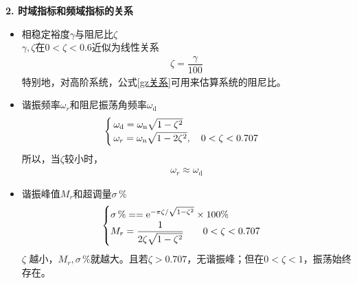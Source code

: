 \noindent \textbf{2. 时域指标和频域指标的关系}
\begin{itemize}
	\item 相稳定裕度$\gamma$与阻尼比$\zeta$\\
	\hspace*{2em} $\gamma,\zeta$在$0<\zeta < 0.6$近似为线性关系
	\begin{align}
		\zeta = \dfrac{\gamma}{100}
		\label{gz关系}
	\end{align} 
	特别地，对高阶系统，公式\eqref{gz关系}可用来估算系统的阻尼比。
	
	\item 谐振频率$\omega_r$和阻尼振荡角频率$\omega_{\text{d}}$
	\[
	\begin{cases}
		\, \omega_{\text{d}} = \omega_{{\rm{n}}} \sqrt{1 - \zeta^2}\\
		\, \omega_r = \omega_{\rm{n}} \sqrt{1 - 2\zeta^2}, \quad 0 < \zeta < 0.707
	\end{cases}
	\]
	 所以，当$\zeta $较小时，
	 \vspace*{-1em}
	 \begin{align}
	 	\omega_r \approx \omega_{\text{d}}
	 \end{align}
 
 	\item 谐振峰值$M_r$和超调量$\sigma\, \%$
 	\begin{align*}
 		\begin{cases}
 			\sigma \, \% =  ={\rm{e}}^{- \pi \zeta / \sqrt{1 - \zeta^2}} \times 100 \%\\
 			M_r = \dfrac{1}{2 \zeta \sqrt{1 - \zeta^2}}\quad \quad 0< \zeta < 0.707
 		\end{cases}
 	\end{align*}
 	$\zeta$ 越小，$M_r, \sigma \, \%$就越大。且若$\zeta >0.707$，无谐振峰；但在$0<\zeta <1$，振荡始终存在。
\end{itemize}
\vspace{0.5em}

